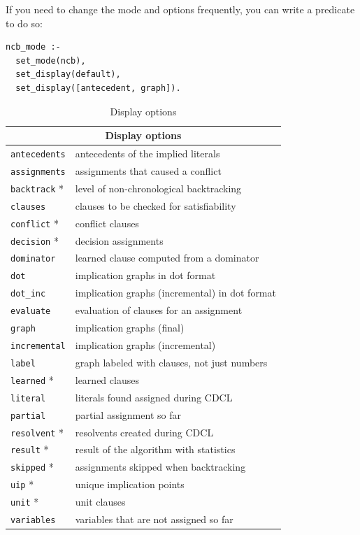 \documentclass[11pt]{report}
\newcommand*{\p}[1]{\textup{\texttt{#1}}}
\begin{document}
\pagebreak[3]

If you need to change the mode and options frequently, you
can write a predicate to do so:
\begin{verbatim}
ncb_mode :-
  set_mode(ncb),
  set_display(default),
  set_display([antecedent, graph]).
\end{verbatim}

\begin{table}[tbp]
\begin{center}
\begin{tabular}{|l|l|}
\hline
\multicolumn{2}{|c|}{\textbf{\large Display options}}\\
\hline
\p{antecedents}&  antecedents of the implied literals\\
\p{assignments}& assignments that caused a conflict         \\
\p{backtrack} *&  level of non-chronological backtracking    \\
\p{clauses}   &  clauses to be checked for satisfiability   \\
\p{conflict} * &  conflict clauses                           \\
\p{decision} * &  decision assignments                       \\
\p{dominator} &  learned clause computed from a dominator   \\
\p{dot}       &  implication graphs in dot format           \\
\p{dot\_inc}  &  implication graphs (incremental) in dot format\\
\p{evaluate}  &  evaluation of clauses for an assignment    \\
\p{graph}     &  implication graphs (final)                 \\
\p{incremental}& implication graphs (incremental)           \\
\p{label}     &  graph labeled with clauses, not just numbers\\
\p{learned} *  &  learned clauses                            \\
\p{literal}   &  literals found assigned during CDCL        \\
\p{partial}   &  partial assignment so far                  \\
\p{resolvent} * &  resolvents created during CDCL             \\
\p{result} *   &  result of the algorithm with statistics    \\
\p{skipped} *  &  assignments skipped when backtracking      \\
\p{uip} *       &  unique implication points                  \\
\p{unit} *     &  unit clauses                               \\
\p{variables} &  variables that are not assigned so far     \\
\hline
\end{tabular}
\end{center}
\caption{Display options}\label{tab.display}
\end{table}
\end{document}
